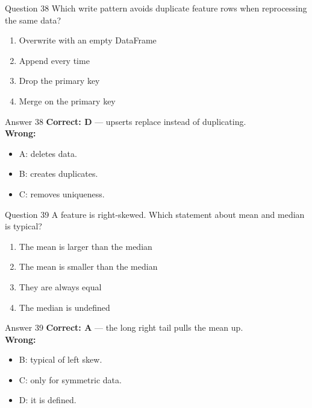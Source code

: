 \documentclass[aspectratio=169,11pt]{beamer}
\begin{document}
\begin{frame}{Question 38}
Which write pattern avoids duplicate feature rows when reprocessing the same data?
\begin{enumerate}[label=\Alph*.]
\item Overwrite with an empty DataFrame
\item Append every time
\item Drop the primary key
\item Merge on the primary key
\end{enumerate}
\end{frame}
\begin{frame}{Answer 38}
\textbf{Correct: D} --- upserts replace instead of duplicating.\\
\vspace{0.5em}
\textbf{Wrong:}
\begin{itemize}
\item A: deletes data.
\item B: creates duplicates.
\item C: removes uniqueness.
\end{itemize}
\end{frame}

\begin{frame}{Question 39}
A feature is right-skewed. Which statement about mean and median is typical?
\begin{enumerate}[label=\Alph*.]
\item The mean is larger than the median
\item The mean is smaller than the median
\item They are always equal
\item The median is undefined
\end{enumerate}
\end{frame}
\begin{frame}{Answer 39}
\textbf{Correct: A} --- the long right tail pulls the mean up.\\
\vspace{0.5em}
\textbf{Wrong:}
\begin{itemize}
\item B: typical of left skew.
\item C: only for symmetric data.
\item D: it is defined.
\end{itemize}
\end{frame}
\end{document}
